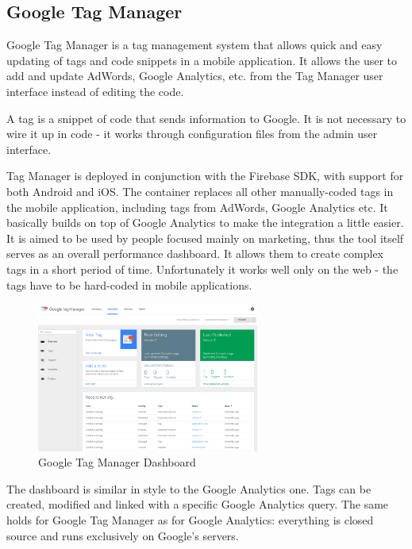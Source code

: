 \subsection{Google Tag Manager}

Google Tag Manager is a tag management system that allows quick and easy updating of tags and code snippets in a mobile application. It allows the user to add and update AdWords, Google Analytics, etc. from the Tag Manager user interface instead of editing the code.

A tag is a snippet of code that sends information to Google. It is not necessary to wire it up in code - it works through configuration files from the admin user interface.

Tag Manager is deployed in conjunction with the Firebase SDK, with support for both Android and iOS. The container replaces all other manually-coded tags in the mobile application, including tags from AdWords, Google Analytics etc. It basically builds on top of Google Analytics to make the integration a little easier. It is aimed to be used by people focused mainly on marketing, thus the tool itself serves as an overall performance dashboard. It allows them to create complex tags in a short period of time. Unfortunately it works well only on the web - the tags have to be hard-coded in mobile applications.

\newpage

\begin{figure}[!ht]
	\centering
	\includegraphics[width=0.65\textwidth]{figures/02_analysis/tagmanager}
    \caption{Google Tag Manager Dashboard}
\end{figure}

The dashboard is similar in style to the Google Analytics one. Tags can be created, modified and linked with a specific Google Analytics query. The same holds for Google Tag Manager as for Google Analytics: everything is closed source and runs exclusively on Google's servers.

